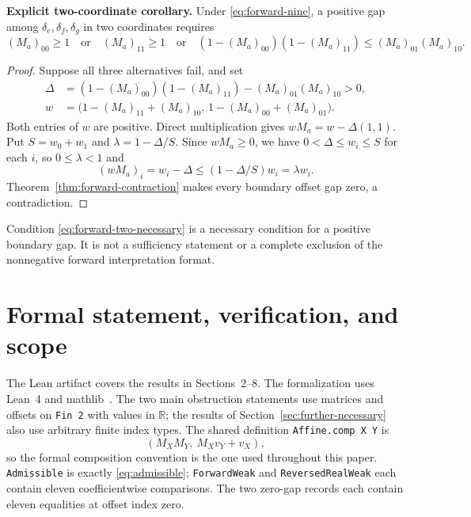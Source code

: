 \documentclass[11pt,a4paper]{article}
\newcommand{\R}{\mathbb R}
\newcommand{\code}[1]{\texttt{#1}}
\begin{document}
\noindent\textbf{Explicit two-coordinate corollary.}
Under \eqref{eq:forward-nine}, a positive gap among
$\delta_e,\delta_f,\delta_g$ in two coordinates requires
\begin{equation}\label{eq:forward-two-necessary}
 (M_a)_{00}\ge1\quad\text{or}\quad (M_a)_{11}\ge1
 \quad\text{or}\quad
 (1-(M_a)_{00})(1-(M_a)_{11})
 \le (M_a)_{01}(M_a)_{10}.
\end{equation}
\begin{proof}
Suppose all three alternatives fail, and set
\[
 \begin{aligned}
 \Delta&=(1-(M_a)_{00})(1-(M_a)_{11})
              -(M_a)_{01}(M_a)_{10}>0,\\
 w&=\bigl(1-(M_a)_{11}+(M_a)_{10},\,
         1-(M_a)_{00}+(M_a)_{01}\bigr).
 \end{aligned}
\]
Both entries of $w$ are positive. Direct multiplication gives
$wM_a=w-\Delta(1,1)$. Put $S=w_0+w_1$ and
$\lambda=1-\Delta/S$. Since $wM_a\ge0$, we have
$0<\Delta\le w_i\le S$ for each $i$, so $0\le\lambda<1$ and
\[
 (wM_a)_i=w_i-\Delta\le(1-\Delta/S)w_i=\lambda w_i.
\]
Theorem~\ref{thm:forward-contraction} makes every boundary offset gap
zero, a contradiction.
\end{proof}

Condition \eqref{eq:forward-two-necessary} is a necessary condition
for a positive boundary gap. It is not a sufficiency statement or a
complete exclusion of the nonnegative forward interpretation format.

\section{Formal statement, verification, and scope}
The Lean artifact covers the results in Sections~2--8.
The formalization uses Lean~4 and mathlib~\cite{lean4,mathlib}. The two
main obstruction statements use matrices and offsets on
\code{Fin 2} with values in $\R$; the results of
Section~\ref{sec:further-necessary} also use arbitrary finite index types.
The shared definition \code{Affine.comp X Y} is
\[
(M_XM_Y,\ M_Xv_Y+v_X),
\]
so the formal composition convention is the one used throughout this
paper. \code{Admissible} is exactly \eqref{eq:admissible};
\code{ForwardWeak} and \code{ReversedRealWeak} each contain eleven
coefficientwise comparisons. The two zero-gap records each contain
eleven equalities at offset index zero.
\end{document}
